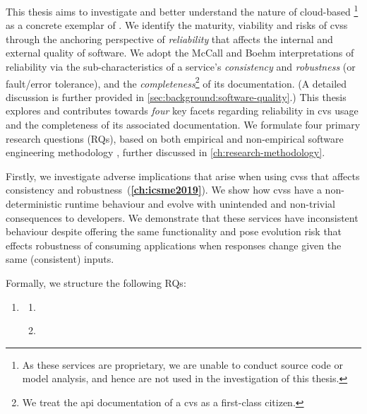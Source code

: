 This thesis aims to investigate and better understand the nature of cloud-based \footnote{As these services are proprietary, we are unable to conduct source code or model analysis, and hence are not used in the investigation of this thesis.} as a concrete exemplar of .
We identify the maturity, viability and risks of \glspl{cvs} through the anchoring perspective of \textit{reliability} that affects the internal and external quality of software. We adopt the McCall \citep{McCall:1977uy} and Boehm \citep{Boehm:1978vv} interpretations of reliability via the sub-characteristics of a service's \textit{consistency} and \textit{robustness} (or fault/error tolerance), and the \textit{completeness}\footnote{We treat the \gls{api} documentation of a \gls{cvs} as a first-class citizen.} of its documentation. (A detailed discussion is further provided in \cref{sec:background:software-quality}.)
This thesis explores and contributes towards \textit{four} key facets regarding reliability in \gls{cvs} usage and the completeness of its associated documentation. We formulate four primary research questions (RQs), based on both empirical and non-empirical software engineering methodology \citep{Simon:1996uw}, further discussed in \cref{ch:research-methodology}.

Firstly, we investigate adverse implications that arise when using \glspl{cvs} that affects consistency and robustness~(\textbf{\cref{ch:icsme2019}}). We show how \glspl{cvs} have a non-deterministic runtime behaviour and evolve with unintended and non-trivial consequences to developers. We demonstrate that these services have inconsistent behaviour despite offering the same functionality and pose evolution risk that effects robustness of consuming applications when responses change given the same (consistent) inputs. 

\clearpage
Formally, we structure the following RQs:

\begin{leftbar}
\begin{enumerate}[label=\faQuestionCircle~~\textbf{RQ\arabic*.}, ref=RQ\arabic*, leftmargin=2.5\parindent, rightmargin=1\parindent]
    \item \textbf{\RQOneTextLandscapeAnalysis{}}\label{rq:nature}
    \begin{enumerate}[label=\textit{RQ1.\arabic*.}, ref=RQ1.\arabic*]
      \item \RQOneTextLandscapeAnalysisRuntime{}\label{rq:nature:runtime}
      \item \RQOneTextLandscapeAnalysisEvolution{}\label{rq:nature:evolution}
    \end{enumerate}
\end{enumerate}
\end{leftbar}

